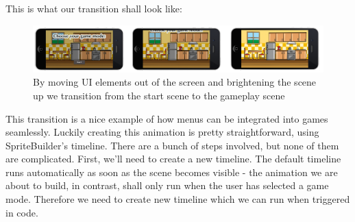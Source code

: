 This is what our transition shall look like:

\begin{figure}[H]
		\centering
		\includegraphics[width=0.85\linewidth]{images/Chapter7/gameplay_transition.png}
		\caption{By moving UI elements out of the screen and brightening the scene up
		we transition from the start scene to the gameplay scene}
\end{figure}

This transition is a nice example of how menus can be integrated into games
seamlessly. Luckily creating this animation is pretty straightforward, using
SpriteBuilder's timeline. There are a bunch of steps involved, but none of them
are complicated. First, we'll need to create a new timeline. The default
timeline runs automatically as soon as the scene becomes visible - the animation
we are about to build, in contrast, shall only run when the user has selected a
game mode. Therefore we need to create new timeline which we can run when
triggered in code.

